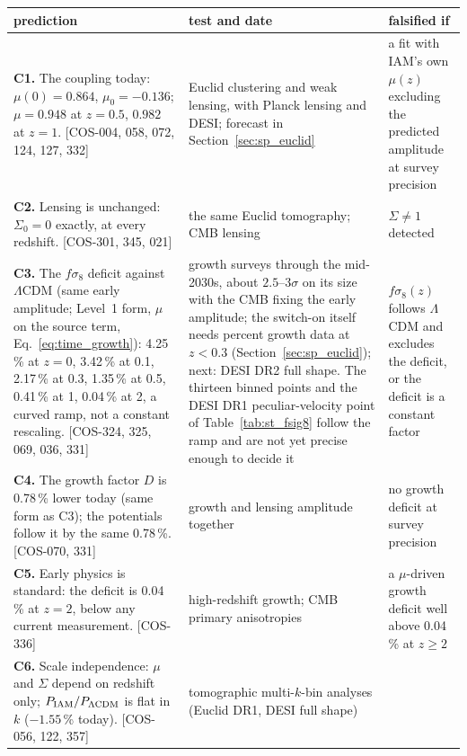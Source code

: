 {\small\begin{longtable}{@{}>{\raggedright\arraybackslash}p{}>{\raggedright\arraybackslash}p{}>{\raggedright\arraybackslash}p{}@{}}
\toprule
prediction & test and date & falsified if \\\midrule\endhead
\textbf{C1.} \Spending{} The coupling today: $\mu(0)=0.864$, $\mu_0=-0.136$; $\mu=0.948$ at $z=0.5$, $0.982$ at $z=1$. [COS-004, 058, 072, 124, 127, 332]
 & Euclid clustering and weak lensing, with Planck lensing and DESI; forecast in Section~\ref{sec:sp_euclid}
 & a fit with IAM's own $\mu(z)$ excluding the predicted amplitude at survey precision \\
\textbf{C2.} \Spending{} Lensing is unchanged: $\Sigma_0=0$ exactly, at every redshift. [COS-301, 345, 021]
 & the same Euclid tomography; CMB lensing
 & $\Sigma\ne1$ detected \\ \cmidrule{1-3}
\textbf{C3.} \Spending{} The $f\sigma_8$ deficit against $\Lambda$CDM (same early amplitude; Level~1 form, $\mu$ on the source term, Eq.~\eqref{eq:time_growth}): 4.25\,\% at $z=0$, 3.42\,\% at 0.1, 2.17\,\% at 0.3, 1.35\,\% at 0.5,
 0.41\,\% at 1, 0.04\,\% at 2, a curved ramp, not a constant rescaling. [COS-324, 325, 069, 036, 331]
 & growth surveys through the mid-2030s, about $2.5$--$3\sigma$ on its size with the CMB fixing the early amplitude; the switch-on itself needs percent
 growth data at $z<0.3$ (Section~\ref{sec:sp_euclid}); next: DESI DR2 full shape. The thirteen binned points and the DESI DR1 peculiar-velocity point of Table~\ref{tab:st_fsig8} follow the ramp and are not yet precise enough to decide it
 & $f\sigma_8(z)$ follows $\Lambda$CDM and excludes the deficit, or the deficit is a constant factor \\
\textbf{C4.} \Spending{} The growth factor $D$ is 0.78\,\% lower today (same form as C3); the potentials follow it by the same 0.78\,\%. [COS-070, 331]
 & growth and lensing amplitude together
 & no growth deficit at survey precision \\ \cmidrule{1-3}
\textbf{C5.} \Spending{} Early physics is standard: the deficit is 0.04\,\% at $z=2$, below any current measurement. [COS-336]
 & high-redshift growth; CMB primary anisotropies
 & a $\mu$-driven growth deficit well above 0.04\,\% at $z\ge2$ \\ \cmidrule{1-3}
\textbf{C6.} \Spending{} Scale independence: $\mu$ and $\Sigma$ depend on redshift only; $P_{\rm IAM}/P_{\Lambda\rm CDM}$ is flat in $k$ ($-1.55$\,\% today). [COS-056, 122, 357]
 & tomographic multi-$k$-bin analyses (Euclid DR1, DESI full shape)

\end{longtable}}
